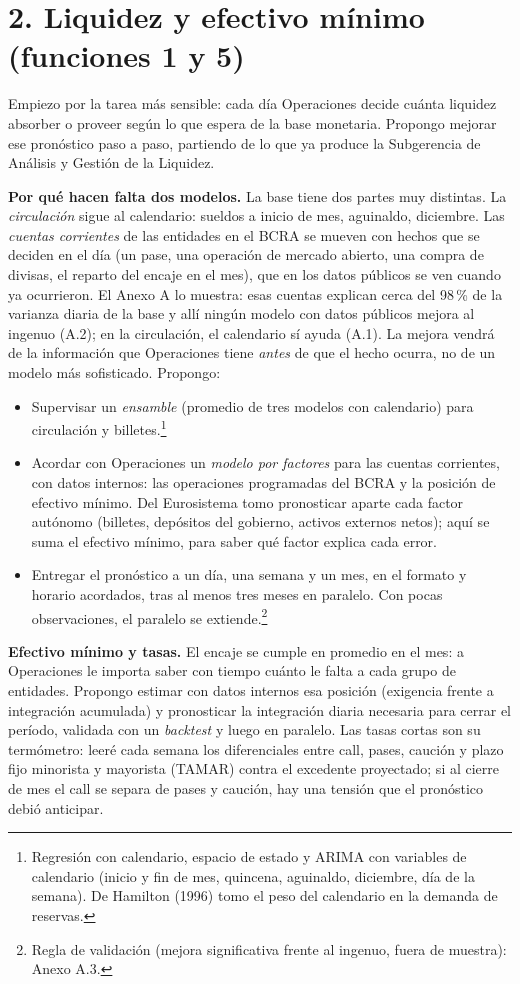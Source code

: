 \documentclass[11pt,a4paper]{article}
\begin{document}
\section*{2. Liquidez y efectivo mínimo (funciones 1 y 5)}
Empiezo por la tarea más sensible: cada día Operaciones decide cuánta liquidez absorber o proveer según lo que espera de la base monetaria. Propongo mejorar ese pronóstico paso a paso, partiendo de lo que ya produce la Subgerencia de Análisis y Gestión de la Liquidez.

\textbf{Por qué hacen falta dos modelos.} La base tiene dos partes muy distintas. La \emph{circulación} sigue al calendario: sueldos a inicio de mes, aguinaldo, diciembre. Las \emph{cuentas corrientes} de las entidades en el BCRA se mueven con hechos que se deciden en el día (un pase, una operación de mercado abierto, una compra de divisas, el reparto del encaje en el mes), que en los datos públicos se ven cuando ya ocurrieron. El Anexo A lo muestra: esas cuentas explican cerca del 98\,\% de la varianza diaria de la base y allí ningún modelo con datos públicos mejora al ingenuo (A.2); en la circulación, el calendario sí ayuda (A.1). La mejora vendrá de la información que Operaciones tiene \emph{antes} de que el hecho ocurra, no de un modelo más sofisticado. Propongo:
\begin{itemize}
\item Supervisar un \emph{ensamble} (promedio de tres modelos con calendario) para circulación y billetes.\footnote{Regresión con calendario, espacio de estado y ARIMA con variables de calendario (inicio y fin de mes, quincena, aguinaldo, diciembre, día de la semana). De Hamilton (1996) tomo el peso del calendario en la demanda de reservas.}
\item Acordar con Operaciones un \emph{modelo por factores} para las cuentas corrientes, con datos internos: las operaciones programadas del BCRA y la posición de efectivo mínimo. Del Eurosistema tomo pronosticar aparte cada factor autónomo (billetes, depósitos del gobierno, activos externos netos); aquí se suma el efectivo mínimo, para saber qué factor explica cada error.
\item Entregar el pronóstico a un día, una semana y un mes, en el formato y horario acordados, tras al menos tres meses en paralelo. Con pocas observaciones, el paralelo se extiende.\footnote{Regla de validación (mejora significativa frente al ingenuo, fuera de muestra): Anexo A.3.}
\end{itemize}

\textbf{Efectivo mínimo y tasas.} El encaje se cumple en promedio en el mes: a Operaciones le importa saber con tiempo cuánto le falta a cada grupo de entidades. Propongo estimar con datos internos esa posición (exigencia frente a integración acumulada) y pronosticar la integración diaria necesaria para cerrar el período, validada con un \emph{backtest} y luego en paralelo. Las tasas cortas son su termómetro: leeré cada semana los diferenciales entre call, pases, caución y plazo fijo minorista y mayorista (TAMAR) contra el excedente proyectado; si al cierre de mes el call se separa de pases y caución, hay una tensión que el pronóstico debió anticipar.
\end{document}
